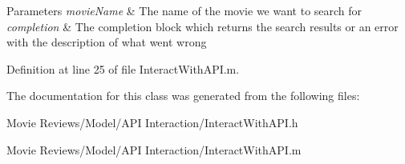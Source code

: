 \begin{DoxyParams}{Parameters}
{\em movie\+Name} & The name of the movie we want to search for \\
\hline
{\em completion} & The completion block which returns the search results or an error with the description of what went wrong \\
\hline
\end{DoxyParams}


Definition at line 25 of file Interact\+With\+A\+P\+I.\+m.



The documentation for this class was generated from the following files\+:\begin{DoxyCompactItemize}
\item 
Movie Reviews/\+Model/\+A\+P\+I Interaction/Interact\+With\+A\+P\+I.\+h\item 
Movie Reviews/\+Model/\+A\+P\+I Interaction/Interact\+With\+A\+P\+I.\+m\end{DoxyCompactItemize}
